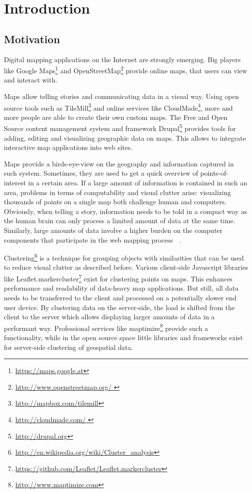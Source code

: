 
%
%

\chapter{Introduction}


\section{Motivation}

Digital mapping applications on the Internet are strongly emerging. Big players like Google Maps\footnote{\url{https://maps.google.at}} and OpenStreetMap\footnote{\url{http://www.openstreetmap.org/ }} provide online maps, that users can view and interact with. 

Maps allow telling stories and communicating data in a visual way. Using open source tools such as TileMill\footnote{\url{http://mapbox.com/tilemill}} and online services like CloudMade\footnote{\url{http://cloudmade.com/ }}, more and more people are able to create their own custom maps. The Free and Open Source content management system and framework Drupal\footnote{\url{http://drupal.org}} provides tools for adding, editing and visualizing geographic data on maps. This allows to integrate interactive map applications into web sites.

Maps provide a birds-eye-view on the geography and information captured in such system. Sometimes, they are used to get a quick overview of points-of-interest in a certain area. If a large amount of information is contained in such an area, problems in terms of computability and visual clutter arise: visualizing thousands of points on a single map both challenge human and computers. Obviously, when telling a story, information needs to be told in a compact way as the human brain can only process a limited amount of data at the same time. Similarly, large amounts of data involve a higher burden on the computer components that participate in the web mapping process~~\cite{noellenburg11geovis, Delort10vis}.

Clustering\footnote{\url{http://en.wikipedia.org/wiki/Cluster_analysis}} is a technique for grouping objects with similarities that can be used to reduce visual clutter as described before. Various client-side Javascript libraries like Leaflet.markercluster\footnote{\url{https://github.com/Leaflet/Leaflet.markercluster}} exist for clustering points on maps. This enhances performance and readability of data-heavy map applications. But still, all data needs to be transferred to the client and processed on a potentially slower end user device. By clustering data on the server-side, the load is shifted from the client to the server which allows displaying larger amounts of data in a performant way. Professional services like maptimize\footnote{\url{http://www.maptimize.com}} provide such a functionality, while in the open source space little libraries and frameworks exist for server-side clustering of geospatial data.

